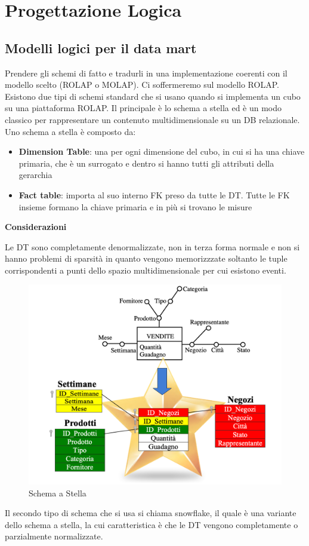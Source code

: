 \section{Progettazione Logica}

\subsection{Modelli logici per il data mart}
Prendere gli schemi di fatto e tradurli in una implementazione coerenti con il modello scelto (ROLAP o MOLAP). Ci soffermeremo sul modello ROLAP. Esistono due tipi di schemi standard che si usano quando si implementa un cubo su una piattaforma ROLAP. Il principale è lo schema a stella ed è un modo classico per rappresentare un contenuto multidimensionale su un DB relazionale. Uno schema a stella è composto da:
\begin{itemize}
	\item 
	\textbf{Dimension Table}: una per ogni dimensione del cubo, in cui si ha una chiave primaria, che è un surrogato e dentro si hanno tutti gli attributi della gerarchia
	\item
	\textbf{Fact table}: importa al suo interno FK preso da tutte le DT. Tutte le FK insieme formano la chiave primaria e in più si trovano le misure
\end{itemize}

\textbf{Considerazioni}

Le DT sono completamente denormalizzate, non in terza forma normale e non si hanno problemi di sparsità in quanto vengono memorizzzate soltanto le tuple corrispondenti a punti dello spazio multidimensionale per cui esistono eventi. 
\begin{figure}[H]
	\centering
	\includegraphics[width=0.6\linewidth]{img/stella}
	\caption{Schema a Stella}
	\label{fig:stella}
\end{figure}
Il secondo tipo di schema che si usa si chiama snowflake, il quale è una variante dello schema a stella, la cui caratteristica è che le DT vengono completamente o parzialmente normalizzate. 

